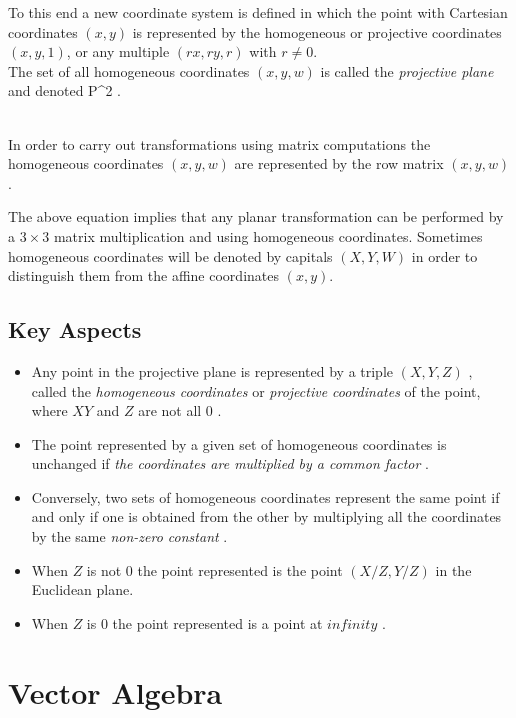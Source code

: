 \documentclass[12pt]{report}
\begin{document}
To this end a new coordinate system is defined in which the point with Cartesian coordinates $(x , y)$ is represented by the homogeneous or projective coordinates $( x , y , 1 )$, or any multiple $( rx , ry , r )$ with $ r \neq 0 $.
\\
\vspace{.5cm}
The set of all homogeneous coordinates $(x , y , w)$ is called the \textit{projective plane} and denoted P^2 . 

\\In order to carry out transformations using matrix computations the homogeneous coordinates $( x, y, w )$ are represented by the row matrix $(x, y, w)$. 
\\
\vspace{.5cm}

\hspace{1cm} The above equation implies that any planar transformation can be performed by a $ 3 × 3 $ matrix multiplication and using homogeneous coordinates. Sometimes homogeneous coordinates will be denoted by capitals $ (X, Y, W) $  in order to distinguish them from the affine coordinates $(x, y)$.


\subsection{Key Aspects}
\begin{itemize}
  \item 
  Any point in the projective plane is represented by a triple $ (X, Y, Z) $ , called the \textit{ homogeneous coordinates }  or \textit{ projective coordinates } of the point, where $ X Y$  and $ Z$  are not all $ 0$ .
  \item 
  The point represented by a given set of homogeneous coordinates is unchanged if \textit{  the coordinates are multiplied by a common factor }.
  \item 
  Conversely, two sets of homogeneous coordinates represent the same point if and only if one is obtained from the other by multiplying all the coordinates by the same  \textit{ non-zero constant }.
  \item 
  When $ Z $  is not $ 0$  the point represented is the point $ (X/Z, Y/Z)$  in the Euclidean plane.
  \item 
  When $ Z $  is $ 0$  the point represented is a point at $ infinity $ .
\end{itemize}

\section{Vector Algebra}
\end{document}
